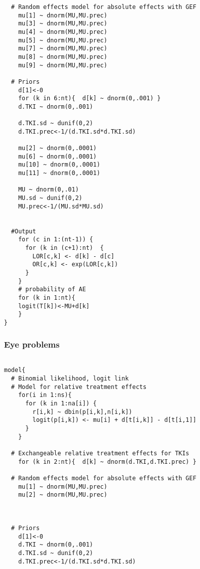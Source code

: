\documentclass[11pt,final,fleqn]{article}\usepackage[]{graphicx}\usepackage[]{color}
\theoremstyle{plain}
\begin{document}
\begin{appendices}
\begin{verbatim}
  # Random effects model for absolute effects with GEF
    mu[1] ~ dnorm(MU,MU.prec) 
    mu[3] ~ dnorm(MU,MU.prec)
    mu[4] ~ dnorm(MU,MU.prec)
    mu[5] ~ dnorm(MU,MU.prec) 
    mu[7] ~ dnorm(MU,MU.prec) 
    mu[8] ~ dnorm(MU,MU.prec) 
    mu[9] ~ dnorm(MU,MU.prec)    
       
  # Priors
    d[1]<-0                                      
    for (k in 6:nt){  d[k] ~ dnorm(0,.001) }     
    d.TKI ~ dnorm(0,.001)
    
    d.TKI.sd ~ dunif(0,2) 
    d.TKI.prec<-1/(d.TKI.sd*d.TKI.sd)
    
    mu[2] ~ dnorm(0,.0001)                     
    mu[6] ~ dnorm(0,.0001)                       
    mu[10] ~ dnorm(0,.0001)                       
    mu[11] ~ dnorm(0,.0001)                       
      
    MU ~ dnorm(0,.01)                         
    MU.sd ~ dunif(0,2) 
    MU.prec<-1/(MU.sd*MU.sd)
    
      
  #Output                                       
    for (c in 1:(nt-1)) {                        
      for (k in (c+1):nt)  { 
        LOR[c,k] <- d[k] - d[c]
        OR[c,k] <- exp(LOR[c,k])
      }  
    }
    # probability of AE
    for (k in 1:nt){ 
    logit(T[k])<-MU+d[k]
    }
}

\end{verbatim}

\subsubsection{Eye problems} 
\begin{verbatim} 

model{
  # Binomial likelihood, logit link
  # Model for relative treatment effects
    for(i in 1:ns){                  
      for (k in 1:na[i]) {               
        r[i,k] ~ dbin(p[i,k],n[i,k])     
        logit(p[i,k]) <- mu[i] + d[t[i,k]] - d[t[i,1]]  
      }
    }   
  
  # Exchangeable relative treatment effects for TKIs
    for (k in 2:nt){  d[k] ~ dnorm(d.TKI,d.TKI.prec) }
  
  # Random effects model for absolute effects with GEF
    mu[1] ~ dnorm(MU,MU.prec) 
    mu[2] ~ dnorm(MU,MU.prec) 
  
       
       
  # Priors
    d[1]<-0                                      
    d.TKI ~ dnorm(0,.001)
    d.TKI.sd ~ dunif(0,2) 
    d.TKI.prec<-1/(d.TKI.sd*d.TKI.sd)
      

\end{verbatim}
\end{appendices}
\end{document}
